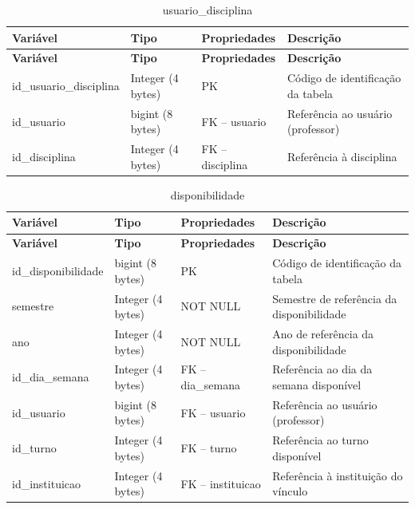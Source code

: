 \fonteautores

\vspace{\baselineskip}

\Needspace{0.32\textheight}
\begin{longtable}{|L{5.2cm}|L{3.2cm}|L{2.4cm}|L{3.4cm}|}
\caption{usuario\_disciplina} \\
\hline
\textbf{Variável} & \textbf{Tipo} & \textbf{Propriedades} & \textbf{Descrição} \\
\hline
\endfirsthead
\hline
\textbf{Variável} & \textbf{Tipo} & \textbf{Propriedades} & \textbf{Descrição} \\
\hline
\endhead
id\_usuario\_disciplina & Integer (4 bytes) & PK & Código de identificação da tabela \\
\hline
id\_usuario & bigint (8 bytes) & FK – usuario & Referência ao usuário (professor) \\
\hline
id\_disciplina & Integer (4 bytes) & FK – disciplina & Referência à disciplina \\
\hline
\end{longtable}

\fonteautores

\vspace{\baselineskip}

\Needspace{0.32\textheight}
\begin{longtable}{|L{5.2cm}|L{3.2cm}|L{2.4cm}|L{3.4cm}|}
\caption{disponibilidade} \\
\hline
\textbf{Variável} & \textbf{Tipo} & \textbf{Propriedades} & \textbf{Descrição} \\
\hline
\endfirsthead
\hline
\textbf{Variável} & \textbf{Tipo} & \textbf{Propriedades} & \textbf{Descrição} \\
\hline
\endhead
id\_disponibilidade & bigint (8 bytes) & PK & Código de identificação da tabela \\
\hline
semestre & Integer (4 bytes) & NOT NULL & Semestre de referência da disponibilidade \\
\hline
ano & Integer (4 bytes) & NOT NULL & Ano de referência da disponibilidade \\
\hline
id\_dia\_semana & Integer (4 bytes) & FK – dia\_semana & Referência ao dia da semana disponível \\
\hline
id\_usuario & bigint (8 bytes) & FK – usuario & Referência ao usuário (professor) \\
\hline
id\_turno & Integer (4 bytes) & FK – turno & Referência ao turno disponível \\
\hline
id\_instituicao & Integer (4 bytes) & FK – instituicao & Referência à instituição do vínculo \\
\hline
\end{longtable}

